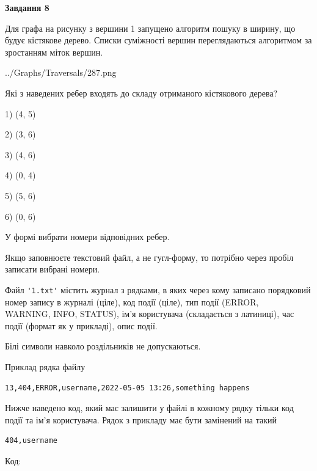 \documentclass[12pt, ukrainian]{article}
\def\code#1{\Verb!#1!}
\begin{document}
{\begin {large}
{\begin {center}\textbf{Завдання 8}\end {center}}\par
Для графа на рисунку з вершини 1 запущено алгоритм пошуку в ширину, що будує кістякове дерево. Списки суміжності вершин переглядаються алгоритмом за зростанням міток вершин.\par
\begin{center}
	{../Graphs/Traversals/287.png}
\end{center}
\par Які з наведених ребер входять до складу отриманого кістякового дерева?\par
1) (4, 5)\par
2) (3, 6)\par
3) (4, 6)\par
4) (0, 4)\par
5) (5, 6)\par
6) (0, 6)\par
{\vskip 15pt} У формі вибрати номери відповідних ребер.


Якщо заповнюєте текстовий файл, а не гугл-форму, то потрібно через пробіл записа\-ти вибрані номери.\par
\newpage


Файл \code{'1.txt'} містить журнал з рядками, в яких через кому записано поряд\-ко\-вий номер запису в журналі (ціле), код події (ціле), тип події (ERROR, \\WARNING, INFO, STATUS), ім'я користувача (складається з латиниці), час події (фор\-мат як у прикладі), опис події.

Білі символи навколо роздільників не допускаються.

Приклад рядка файлу



\begin{verbatim}
13,404,ERROR,username,2022-05-05 13:26,something happens
\end{verbatim}


Нижче наведено код, який має залишити у файлі в кожному рядку тільки код події та ім'я користувача. Рядок з прикладу має бути замінений на такий



\begin{verbatim}
404,username
\end{verbatim}




Код:




\end{large}}
\end{document}

